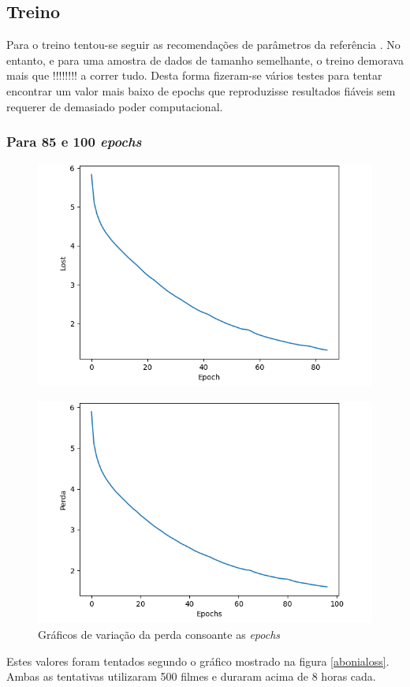 \documentclass{article}
\begin{document}
\subsection{Treino}
Para o treino tentou-se seguir as recomendações de parâmetros da referência \cite{abonia2020seq2seq}. No entanto, e para uma amostra de dados de tamanho semelhante, o treino demorava mais que !!!!!!!! a correr tudo. Desta forma fizeram-se vários testes para tentar encontrar um valor mais baixo de epochs que reproduzisse resultados fiáveis sem requerer de demasiado poder computacional.

\subsubsection{Para 85 e 100 \textit{epochs}}
\begin{figure}[htb]
    \centering
    \includegraphics[scale=0.35]{85loss}
    \caption{}
    \label{85loss}
\end{figure}
\begin{figure}[htb]
    \centering
    \includegraphics[scale=0.35]{100epochs}
    \caption{Gráficos de variação da perda consoante as \textit{epochs}}
    \label{100loss}
\end{figure}
Estes valores foram tentados segundo o gráfico mostrado na figura \ref{abonialoss}. Ambas as tentativas utilizaram 500 filmes e duraram acima de 8 horas cada.
\end{document}
